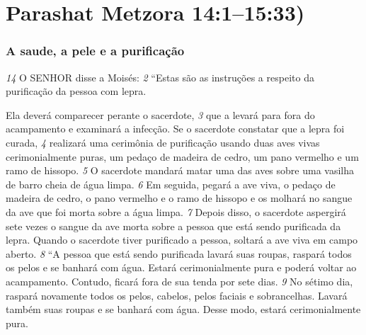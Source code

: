 \section*{Parashat Metzora 14:1–15:33)} 


\subsubsection*{A saude, a pele e a purificação}   
\textit{\tiny 14}
O SENHOR disse a Moisés:    
\textit{\tiny 2} 
“Estas   são as instruções a respeito da
purificação da pessoa com lepra.

\smallskip
 Ela deverá comparecer perante o sacerdote, 
\textit{\tiny 3} 
que a levará para fora do acampamento e examinará a infecção. Se o sacerdote
constatar que a lepra foi curada, 
\textit{\tiny 4} 
realizará uma cerimônia de purificação usando
duas aves vivas cerimonialmente puras, um pedaço de madeira de cedro, um pano
vermelho e um ramo de hissopo. 
\textit{\tiny 5} 
O sacerdote mandará matar uma das aves sobre
uma vasilha de barro cheia de água limpa. 
\textit{\tiny 6} 
Em seguida, pegará a ave viva, o
pedaço de madeira de cedro, o pano vermelho e o ramo de hissopo e os molhará
no sangue da ave que foi morta sobre a água limpa. 
\textit{\tiny 7} 
Depois disso, o sacerdote
aspergirá sete vezes o sangue da ave morta sobre a pessoa que está sendo
purificada da lepra. Quando o sacerdote tiver purificado a pessoa, soltará a ave
viva em campo aberto. 
\textit{\tiny 8} 
“A pessoa que está sendo purificada lavará suas roupas, raspará todos os pelos
e se banhará com água. Estará cerimonialmente pura e poderá voltar ao
acampamento. Contudo, ficará fora de sua tenda por sete dias. 
\textit{\tiny 9} 
No sétimo dia,
raspará novamente todos os pelos, cabelos, pelos faciais e sobrancelhas. Lavará
também suas roupas e se banhará com água. Desse modo, estará cerimonialmente
pura.

